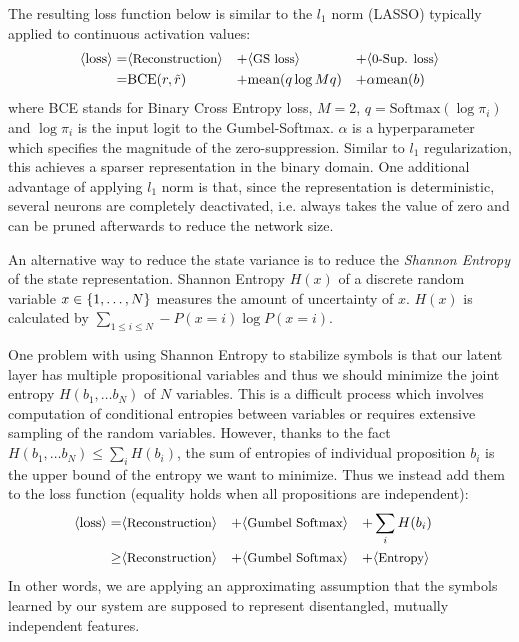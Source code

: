 The resulting loss function below is similar to the $l_1$ norm (LASSO) typically
applied to continuous activation values:
\begin{align*}
 \brackets{\text{loss}} = & \brackets{\text{\small Reconstruction}} &+ & \brackets{\text{\small GS loss}} &+ & \brackets{\text{\small 0-Sup. loss}} \\ 
 =                        & \text{BCE}(r,\tilde{r})     &+ & \text{mean}(q \log Mq)           &+ & \alpha \text{mean}(b)
\end{align*}
where BCE stands for Binary Cross Entropy loss,
$M=2$, $q=\text{Softmax}(\log \pi_i)$ and $\log \pi_i$ is the input logit to the Gumbel-Softmax.
$\alpha$ is a hyperparameter which specifies the magnitude of the zero-suppression.
Similar to $l_1$ regularization, this achieves a sparser representation in the binary domain.
One additional advantage of applying $l_1$ norm is that, since the representation is deterministic,
several neurons are completely deactivated, i.e. always takes the value of zero
and can be pruned afterwards to reduce the network size.

An alternative way to reduce the state variance is to reduce the
\emph{Shannon Entropy} of the state representation.
Shannon Entropy $H(x)$ of a discrete random variable $x\in {\left\{1,\ldots,N\right\}}$
measures the amount of uncertainty of $x$.
% 
$H(x)$ is calculated by $\sum_{1\leq i \leq N} -P(x=i)\log P(x=i)$.
 
One problem with using Shannon Entropy to stabilize symbols is that
our latent layer has multiple propositional variables
and thus we should minimize the joint entropy $H(b_1,\ldots b_N)$ of $N$ variables.
This is a difficult process which involves
computation of conditional entropies between variables
or requires extensive sampling of the random variables.
However, thanks to the fact $H(b_1,\ldots b_N) \leq \sum_{i} H(b_i)$,
the sum of entropies of individual proposition $b_i$ is the upper bound of the entropy we want to minimize.
Thus we instead add them to the loss function (equality holds when all propositions are independent):
\begin{align*}
 \brackets{\text{loss}} =    & \brackets{\text{\small Reconstruction}} &+ & \brackets{\text{\small Gumbel Softmax}} &+ & \sum_{i} H(b_i)& \\
                        \geq & \brackets{\text{\small Reconstruction}} &+ & \brackets{\text{\small Gumbel Softmax}} &+ & \brackets{\text{\small Entropy}}
\end{align*}
In other words, we are applying an approximating assumption that the symbols learned by our system are supposed to represent
disentangled, mutually independent features.

